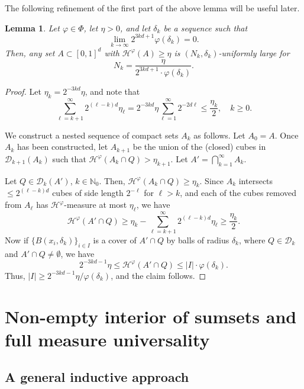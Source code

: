 \documentclass[12pt]{amsart}
\renewcommand{\phi}{\varphi}
\newtheorem{lemma}[theorem]{Lemma}
\def\N{{\mathbb{N}}}
\numberwithin{theorem}{section}
\numberwithin{equation}{section}
\begin{document}
The following refinement of the first part of the above lemma will be useful later.
\begin{lemma} \label{lem:Hausdorff-unif-large}
    Let $\phi\in\Phi$, let $\eta>0$, and let $\delta_k$ be a sequence such that
    \[
        \lim_{k\to\infty} 2^{3kd+1} \phi(\delta_k) = 0.
    \]
    Then, any set $A\subset [0,1]^d$ with $\mathcal{H}^\phi(A)\ge \eta$ is $(N_k,\delta_k)$-uniformly large for
    \[
      N_k= \frac{\eta}{2^{3kd+1} \cdot \phi(\delta_k)}.
    \]
\end{lemma}
\begin{proof}
    Let $\eta_k=2^{-3kd}\eta$, and note that
    \[
        \sum_{\ell=k+1}^\infty 2^{(\ell-k)d}\eta_{\ell} = 2^{-3kd}\eta \sum_{\ell=1}^\infty 2^{-2d\ell} \le \frac{\eta_{k}}{2}, \quad k\ge 0.
    \]

    We construct a nested sequence of compact sets $A_k$ as follows.
    Let $A_0=A$. Once $A_k$ has been constructed, let $A_{k+1}$ be the union of the (closed) cubes in $\mathcal{D}_{k+1}(A_k)$ such that $\mathcal{H}^\phi(A_k\cap Q)> \eta_{k+1}$. Let $A'=\bigcap_{k=1}^\infty A_k$.


    Let $Q\in\mathcal{D}_k(A')$, $k\in\N_0$. Then, $\mathcal{H}^\phi(A_k\cap Q)\ge \eta_k$. Since $A_k$ intersects $\le 2^{(\ell-k)d}$ cubes of side length $2^{-\ell}$ for $\ell>k$, and each of the cubes removed from $A_{\ell}$ has $\mathcal{H}^\phi$-measure at most $\eta_{\ell}$, we have
    \[
        \mathcal{H}^\phi(A'\cap Q) \ge \eta_k - \sum_{\ell=k+1}^\infty 2^{(\ell-k)d}\eta_{\ell} \ge \frac{\eta_k}{2}.
    \]
    Now if $\{ B(x_i,\delta_k)\}_{i\in I}$ is a cover of $A'\cap Q$ by balls of radius $\delta_k$, where $Q\in\mathcal{D}_k$ and $A'\cap Q\neq \emptyset$, we have
    \[
        2^{-3kd-1}\eta \le \mathcal{H}^\phi(A'\cap Q) \le |I|\cdot \phi(\delta_k).
    \]
    Thus, $|I|\ge 2^{-3kd-1}\eta/\phi(\delta_k)$, and the claim follows.
\end{proof}

\section{Non-empty interior of sumsets and full measure universality}

\label{sec:nonempty-interior}

\subsection{A general inductive approach}
\end{document}

